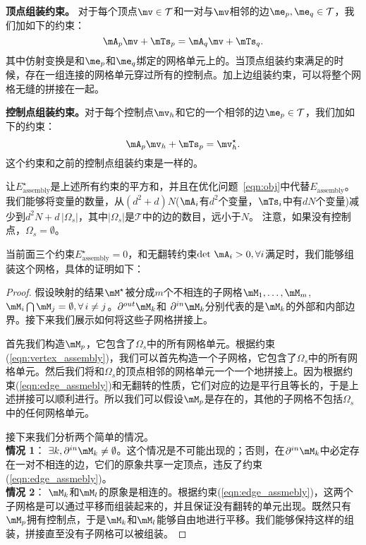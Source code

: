 \textbf{顶点组装约束。} 对于每个顶点$\mv \in \mathcal{T}$和一对与$\mv$相邻的边$\me_p, \me_q \in \mathcal{T}$，我们加如下的约束：
\begin{equation} \label{eqn:vertex_assembly}
\mA_p \mv + \mTs_p = \mA_q \mv + \mTs_q.
\end{equation}
其中仿射变换是和$\me_p$和$\me_q$绑定的网格单元上的。当顶点组装约束满足的时候，存在一组连接的网格单元穿过所有的控制点。加上边组装约束，可以将整个网格无缝的拼接在一起。

\textbf{控制点组装约束。}对于每个控制点$\mv_h$和它的一个相邻的边$\me_p \in \mathcal{T}$，我们加如下的约束：
\begin{equation}\label{eqn:handle_assembly}
\mA_p \mv_h + \mTs_p = \mv^{\star}_h.
\end{equation}
这个约束和之前的控制点组装约束是一样的。

让$E^{\star}_\textrm{assembly}$是上述所有约束的平方和，并且在优化问题~\ref{eqn:obj}中代替$E_\textrm{assembly}$。我们能够将变量的数量，从$(d^2+d)N$($\mA_i$有$d^2$个变量，$\mTs_i$中有$d N$个变量)减少到$d^2 N + d \, |\Omega_s| $，其中$|\Omega_s|$是$\mathcal{T}$中的边的数目，远小于$N$。 注意，如果没有控制点，$\Omega_s = \emptyset$。

当前面三个约束$E^{\star}_\textrm{assembly} = 0$，和无翻转约束$\det \, \mA_i > 0, \forall i$满足时，我们能够组装这个网格，具体的证明如下：
\begin{proof}
假设映射的结果$\mM^\star$被分成$m$个不相连的子网格$\mM_1,\ldots,\mM_m$, $\mM_i \bigcap \mM_j = \emptyset, \forall \, i \neq j$。$\partial^{out} \mM_k$和 $\partial^{in} \mM_k$分别代表的是$\mM_k$的外部和内部边界。接下来我们展示如何将这些子网格拼接上。

首先我们构造$\mM_p$，它包含了$\Omega_s$中的所有网格单元。根据约束(\ref{eqn:vertex_assembly})，我们可以首先构造一个子网格，它包含了$\Omega_s$中的所有网格单元。然后我们将和$\Omega_s$的顶点相邻的网格单元一个一个地拼接上。因为根据约束(\ref{eqn:edge_assmebly})和无翻转的性质，它们对应的边是平行且等长的，于是上述拼接可以顺利进行。所以我们可以假设$\mM_p$是存在的，其他的子网格不包括$\Omega_s$中的任何网格单元。

接下来我们分析两个简单的情况。\\
\textbf{情况 1}： $\exists k, \partial^{in} \mM_k \neq \emptyset$。这个情况是不可能出现的；否则，在$\partial^{in} \mM_k$中必定存在一对不相连的边，它们的原象共享一定顶点，违反了约束(\ref{eqn:edge_assmebly})。\\
\textbf{情况 2}： $\mM_k$和$\mM_l$的原象是相连的。根据约束(\ref{eqn:edge_assmebly})，这两个子网格是可以通过平移而组装起来的，并且保证没有翻转的单元出现。既然只有$\mM_p$拥有控制点，于是$\mM_k$和$\mM_l$能够自由地进行平移。我们能够保持这样的组装，拼接直至没有子网格可以被组装。
\end{proof}

